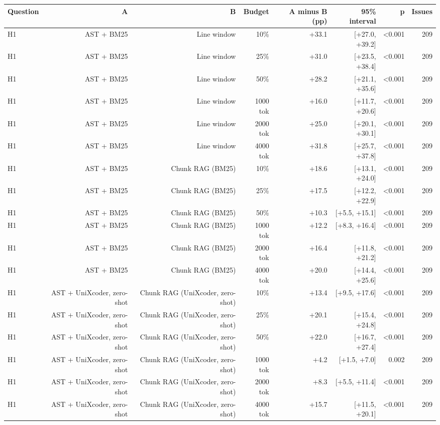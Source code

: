 \begin{tabular}{lrrrrrrr}
\toprule
Question & A & B & Budget & A minus B (pp) & 95\% interval & p & Issues \\
\midrule
H1 & AST + BM25 & Line window & 10\% & +33.1 & [+27.0, +39.2] & <0.001 & 209 \\
H1 & AST + BM25 & Line window & 25\% & +31.0 & [+23.5, +38.4] & <0.001 & 209 \\
H1 & AST + BM25 & Line window & 50\% & +28.2 & [+21.1, +35.6] & <0.001 & 209 \\
H1 & AST + BM25 & Line window & 1000 tok & +16.0 & [+11.7, +20.6] & <0.001 & 209 \\
H1 & AST + BM25 & Line window & 2000 tok & +25.0 & [+20.1, +30.1] & <0.001 & 209 \\
H1 & AST + BM25 & Line window & 4000 tok & +31.8 & [+25.7, +37.8] & <0.001 & 209 \\
H1 & AST + BM25 & Chunk RAG (BM25) & 10\% & +18.6 & [+13.1, +24.0] & <0.001 & 209 \\
H1 & AST + BM25 & Chunk RAG (BM25) & 25\% & +17.5 & [+12.2, +22.9] & <0.001 & 209 \\
H1 & AST + BM25 & Chunk RAG (BM25) & 50\% & +10.3 & [+5.5, +15.1] & <0.001 & 209 \\
H1 & AST + BM25 & Chunk RAG (BM25) & 1000 tok & +12.2 & [+8.3, +16.4] & <0.001 & 209 \\
H1 & AST + BM25 & Chunk RAG (BM25) & 2000 tok & +16.4 & [+11.8, +21.2] & <0.001 & 209 \\
H1 & AST + BM25 & Chunk RAG (BM25) & 4000 tok & +20.0 & [+14.4, +25.6] & <0.001 & 209 \\
H1 & AST + UniXcoder, zero-shot & Chunk RAG (UniXcoder, zero-shot) & 10\% & +13.4 & [+9.5, +17.6] & <0.001 & 209 \\
H1 & AST + UniXcoder, zero-shot & Chunk RAG (UniXcoder, zero-shot) & 25\% & +20.1 & [+15.4, +24.8] & <0.001 & 209 \\
H1 & AST + UniXcoder, zero-shot & Chunk RAG (UniXcoder, zero-shot) & 50\% & +22.0 & [+16.7, +27.4] & <0.001 & 209 \\
H1 & AST + UniXcoder, zero-shot & Chunk RAG (UniXcoder, zero-shot) & 1000 tok & +4.2 & [+1.5, +7.0] & 0.002 & 209 \\
H1 & AST + UniXcoder, zero-shot & Chunk RAG (UniXcoder, zero-shot) & 2000 tok & +8.3 & [+5.5, +11.4] & <0.001 & 209 \\
H1 & AST + UniXcoder, zero-shot & Chunk RAG (UniXcoder, zero-shot) & 4000 tok & +15.7 & [+11.5, +20.1] & <0.001 & 209 \\

\end{tabular}
